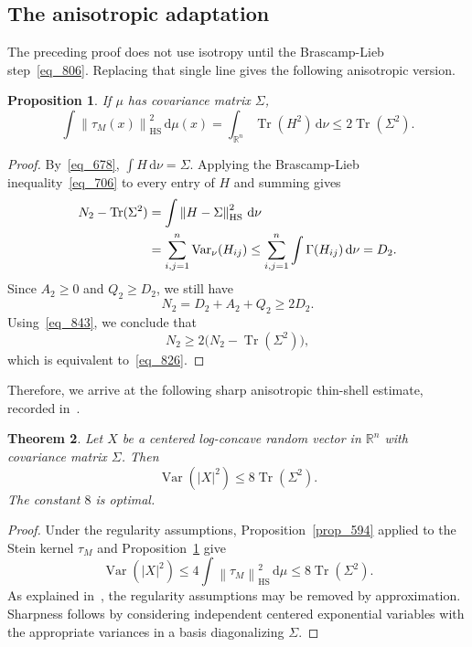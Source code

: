 \documentclass[12pt]{article}
\newtheorem{theorem}{Theorem}[section]
\newtheorem{proposition}[theorem]{Proposition}
\theoremstyle{definition}
\theoremstyle{remark}
\newcommand{\R}{\mathbb R}
\newcommand{\Var}{\operatorname{Var}}
\newcommand{\Tr}{\operatorname{Tr}}
\newcommand{\HS}{\mathrm{HS}}
\newcommand{\dd}{\,\mathrm d}
\newcommand{\norm}[1]{\left\lVert #1\right\rVert}
\newcommand{\tauM}{\tau_M}
\begin{document}
\subsection{The anisotropic adaptation}

The preceding proof does not use isotropy until the Brascamp-Lieb
step~\eqref{eq_806}. Replacing that single line
gives the following anisotropic version.

\begin{proposition}\label{prop_824}
If $\mu$ has covariance matrix $\Sigma$,
\begin{equation}\label{eq_826}
  \int\norm{\tauM(x)}_{\HS}^2\dd\mu(x)
  =\int_{\R^n}\Tr(H^2)\dd\nu
  \leq2\Tr(\Sigma^2).
\end{equation}
\end{proposition}

\begin{proof}
By~\eqref{eq_678}, $\int H\dd\nu=\Sigma$. Applying the
Brascamp-Lieb inequality~\eqref{eq_706} to every entry of $H$
and summing gives
\begin{align}
  N_2-\Tr(\Sigma^2)
  &=\int\norm{H-\Sigma}_{\HS}^2\dd\nu\notag\\
  &=\sum_{i,j=1}^n\Var_\nu(H_{ij})
  \leq\sum_{i,j=1}^n\int\Gamma(H_{ij})\dd\nu
  =D_2.
  \label{eq_843}
\end{align}
Since $A_2\geq0$ and $Q_2\geq D_2$, we still have
\[
  N_2=D_2+A_2+Q_2\geq2D_2.
\]
Using~\eqref{eq_843}, we conclude that
\[
  N_2\geq2\bigl(N_2-\Tr(\Sigma^2)\bigr),
\]
which is equivalent to~\eqref{eq_826}.
\end{proof}

Therefore, we arrive at the following sharp anisotropic thin-shell
estimate, recorded in~\cite{Letwin}.

\begin{theorem}\label{thm_859}
Let $X$ be a centered log-concave random vector in $\R^n$ with
covariance matrix $\Sigma$. Then
\begin{equation}\label{eq_862}
  \Var(|X|^2)\leq8\Tr(\Sigma^2).
\end{equation}
The constant $8$ is optimal.
\end{theorem}

\begin{proof}
Under the regularity assumptions, Proposition~\ref{prop_594}
applied to the Stein kernel $\tauM$ and
Proposition~\ref{prop_824} give
\[
  \Var(|X|^2)
  \leq4\int\norm{\tauM}_{\HS}^2\dd\mu
  \leq8\Tr(\Sigma^2).
\]
As explained in~\cite[Section~3]{ChenKlartag}, the regularity
assumptions may be removed by approximation. Sharpness follows by
considering independent centered exponential variables with the
appropriate variances in a basis diagonalizing $\Sigma$.
\end{proof}
\end{document}
